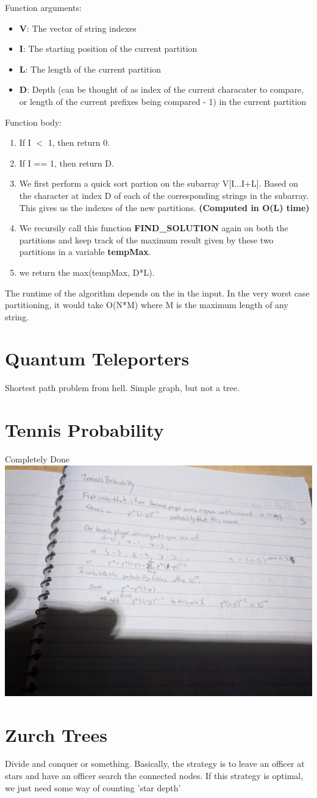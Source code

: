 \documentclass{article}
\begin{document}
\noindent
Function arguments:
\begin{itemize}
  \item \textbf{V}: The vector of string indexes
  \item \textbf{I}: The starting position of the current partition
  \item \textbf{L}: The length of the current partition
  \item \textbf{D}: Depth (can be thought of as index of the current characater to compare, or length of the current prefixes being compared - 1) in the current partition 
\end{itemize}

\noindent
Function body:
\begin{enumerate}
  \item If I $<$ 1, then return 0.
  \item If I == 1, then return D.
  \item We first perform a quick sort partion on the subarray V[I...I+L]. Based on the character at index D of each of the corresponding strings in the subarray. This gives us the indexes of the new partitions. \textbf{(Computed in O(L) time)}
  \item We recursily call this function \textbf{FIND\_SOLUTION} again on both the partitions and keep track of the maximum result given by these two partitions in a variable \textbf{tempMax}.
  \item we return the  max(tempMax, D*L).
\end{enumerate}

\noindent
The runtime of the algorithm depends on the in the input. In the very worst case partitioning, it would take O(N*M) where M is the maximum length of any string.

\section{Quantum Teleporters}
Shortest path problem from hell. Simple graph, but not a tree.


\section{Tennis Probability}
Completely Done
\includegraphics[width=.75\textwidth]{tennisprob}

\section{Zurch Trees}
Divide and conquer or something. Basically, the strategy is to leave an officer at stars and have an officer search the connected nodes. If this strategy is optimal, we just need some way of counting 'star depth'
\end{document}
